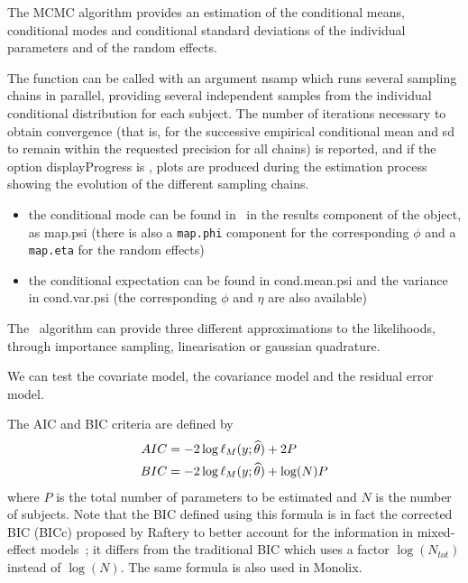 The MCMC algorithm provides an estimation of the conditional means, conditional modes and conditional standard deviations of the individual parameters and of the random effects. 

The function can be called with an argument {\sf nsamp} which runs several sampling chains in parallel, providing several independent samples from the individual conditional distribution for each subject. The number of iterations necessary to obtain convergence (that is, for the successive empirical conditional mean and sd to remain within the requested precision for all chains) is reported, and if the option {\sf displayProgress} is \true, plots are produced during the estimation process showing the evolution of the different sampling chains.

\begin{itemize}
\item the conditional mode can be found in \saemix~in the results component of the object, as {\sf map.psi} (there is also a \texttt{map.phi} component for the corresponding $\phi$ and a \texttt{map.eta} for the random effects)
\item the conditional expectation can be found in {\sf cond.mean.psi} and the variance in {\sf cond.var.psi} (the corresponding $\phi$ and $\eta$ are also available)
\end{itemize}


The \saemix~algorithm can provide three different approximations to the likelihoods, through importance sampling, linearisation or gaussian quadrature. 



We can test the covariate model, the covariance model and the residual error model.

The AIC and BIC criteria are defined by
\begin{eqnarray}
	AIC &= - 2 \log \ell_M(y;{\widehat{\theta}}) + 2 P \\
	BIC &= - 2 \log \ell_M(y;{\widehat{\theta}}) + \log(N) P \label{BICN}
\end{eqnarray}
where $P$ is the total number of parameters to be estimated and $N$ is the number of subjects. Note that the BIC defined using this formula is in fact the corrected BIC (BICc) proposed by Raftery to better account for the information in mixed-effect models~\cite{Raftery95}; it differs from the traditional BIC which uses a factor $\log(N_{tot})$ instead of $\log(N)$. The same formula is also used in {\sc Monolix}.

